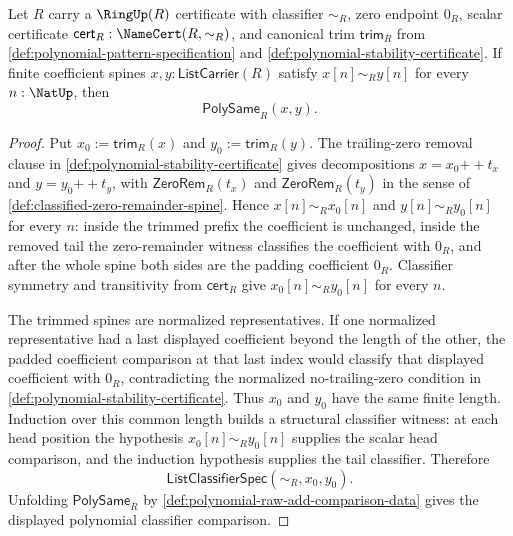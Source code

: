 \begin{lemma}
\label{lem:padded-coefficient-extensionality-polynomial-classifier}
Let $R$ carry a $\RingUp(R)$ certificate with classifier $\sim_R$, zero endpoint $0_R$, scalar certificate $\mathsf{cert}_R:\NameCert(R,\sim_R)$, and canonical trim $\mathsf{trim}_R$ from \autoref{def:polynomial-pattern-specification} and \autoref{def:polynomial-stability-certificate}. If finite coefficient spines $x,y:\mathsf{ListCarrier}(R)$ satisfy $x[n]\sim_R y[n]$ for every $n:\NatUp$, then
$$
\mathsf{PolySame}_R(x,y).
$$
\end{lemma}
\begin{proof}
Put $x_0:=\mathsf{trim}_R(x)$ and $y_0:=\mathsf{trim}_R(y)$. The trailing-zero removal clause in \autoref{def:polynomial-stability-certificate} gives decompositions $x=x_0{++}t_x$ and $y=y_0{++}t_y$, with $\mathsf{ZeroRem}_R(t_x)$ and $\mathsf{ZeroRem}_R(t_y)$ in the sense of \autoref{def:classified-zero-remainder-spine}. Hence $x[n]\sim_R x_0[n]$ and $y[n]\sim_R y_0[n]$ for every $n$: inside the trimmed prefix the coefficient is unchanged, inside the removed tail the zero-remainder witness classifies the coefficient with $0_R$, and after the whole spine both sides are the padding coefficient $0_R$. Classifier symmetry and transitivity from $\mathsf{cert}_R$ give $x_0[n]\sim_R y_0[n]$ for every $n$.

The trimmed spines are normalized representatives. If one normalized representative had a last displayed coefficient beyond the length of the other, the padded coefficient comparison at that last index would classify that displayed coefficient with $0_R$, contradicting the normalized no-trailing-zero condition in \autoref{def:polynomial-stability-certificate}. Thus $x_0$ and $y_0$ have the same finite length. Induction over this common length builds a structural classifier witness: at each head position the hypothesis $x_0[n]\sim_Ry_0[n]$ supplies the scalar head comparison, and the induction hypothesis supplies the tail classifier. Therefore
$$
\mathsf{ListClassifierSpec}(\sim_R,x_0,y_0).
$$
Unfolding $\mathsf{PolySame}_R$ by \autoref{def:polynomial-raw-add-comparison-data} gives the displayed polynomial classifier comparison.
\end{proof}

